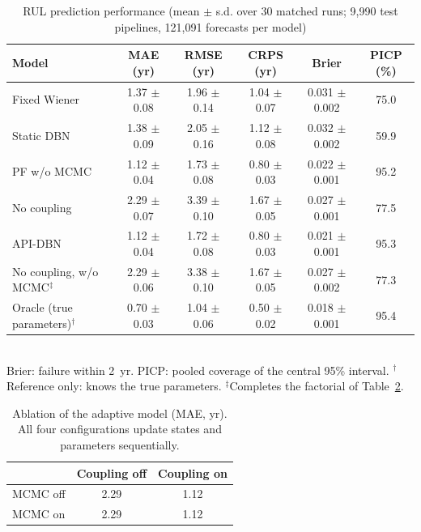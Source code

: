 
\begin{table}[!t]
\centering
\caption{RUL prediction performance (mean $\pm$ s.d. over 30 matched runs; 9{,}990 test pipelines, 121{,}091 forecasts per model)}
\label{tab:rul}
\setlength{\tabcolsep}{3pt}
\begin{tabular}{lccccc}
\toprule
Model & MAE (yr) & RMSE (yr) & CRPS (yr) & Brier & PICP (\%) \\
\midrule
Fixed Wiener & 1.37 $\pm$ 0.08 & 1.96 $\pm$ 0.14 & 1.04 $\pm$ 0.07 & 0.031 $\pm$ 0.002 & 75.0 \\
Static DBN & 1.38 $\pm$ 0.09 & 2.05 $\pm$ 0.16 & 1.12 $\pm$ 0.08 & 0.032 $\pm$ 0.002 & 59.9 \\
PF w/o MCMC & 1.12 $\pm$ 0.04 & 1.73 $\pm$ 0.08 & 0.80 $\pm$ 0.03 & 0.022 $\pm$ 0.001 & 95.2 \\
No coupling & 2.29 $\pm$ 0.07 & 3.39 $\pm$ 0.10 & 1.67 $\pm$ 0.05 & 0.027 $\pm$ 0.001 & 77.5 \\
API-DBN & 1.12 $\pm$ 0.04 & 1.72 $\pm$ 0.08 & 0.80 $\pm$ 0.03 & 0.021 $\pm$ 0.001 & 95.3 \\
\midrule
No coupling, w/o MCMC$^\ddagger$ & 2.29 $\pm$ 0.06 & 3.38 $\pm$ 0.10 & 1.67 $\pm$ 0.05 & 0.027 $\pm$ 0.002 & 77.3 \\
Oracle (true parameters)$^\dagger$ & 0.70 $\pm$ 0.03 & 1.04 $\pm$ 0.06 & 0.50 $\pm$ 0.02 & 0.018 $\pm$ 0.001 & 95.4 \\
\bottomrule
\end{tabular}
\\[2pt]\footnotesize{Brier: failure within 2~yr. PICP: pooled coverage of the central 95\% interval.
$^\dagger$Reference only: knows the true parameters.
 $^\ddagger$Completes the factorial of Table~\ref{tab:ablation}.}
\end{table}

\begin{table}[!t]
\centering
\caption{Ablation of the adaptive model (MAE, yr). All four configurations update states and parameters sequentially.}
\label{tab:ablation}
\begin{tabular}{lcc}
\toprule
 & Coupling off & Coupling on \\
\midrule
MCMC off & 2.29 & 1.12 \\
MCMC on & 2.29 & 1.12 \\
\bottomrule
\end{tabular}
\end{table}

